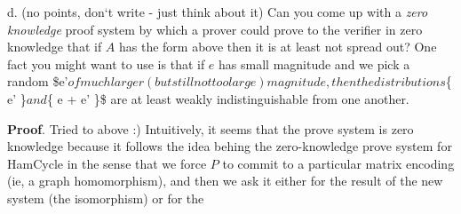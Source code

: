 \documentclass{article}
\begin{document}
\begin{enumerate}[,start=5]
   d. (no points, don\textquoteleft{}t write - just think about it) Can you come up with a \emph{zero knowledge} proof system by which a prover could prove to the verifier in zero knowledge that if $A$ has the form above then it is at least not spread out? One fact you might want to use is that if $e$ has small magnitude and we pick a random \$e\textquoteright{}$ of much larger (but still not too large) magnitude, then the distributions $\{ e' \}$ and $\{ e + e' \}\$ are at least weakly indistinguishable from one another.%

\begin{mdbmarginx}{1ex}{0pt}{1ex}{0pt}%
\noindent{}\textbf{Proof}.  Tried to above :) Intuitively, it seems that the prove system is zero knowledge because it follows
the idea behing the zero-knowledge prove system for HamCycle in the sense that we force $P$
to commit to a particular matrix encoding (ie, a graph homomorphism), and then we ask it 
either for the result of the new system (the isomorphism) or for the%
\end{mdbmarginx}%
\end{enumerate}%
\end{document}
